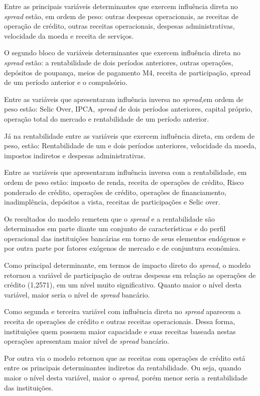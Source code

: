 \documentclass[
  12pt,
  12pt,
  openright,
  oneside,
  a4paper,
  chapter=TITLE,
  section=TITLE,
  subsection=TITLE,
  subsubsection=TITLE,
  portugues,
  sumario=tradicional]{abntex2}
\begin{document}
Entre as principais variáveis determinantes que exercem influência direta no \emph{spread} estão, em ordem de peso: outras despesas operacionais, as receitas de operação de crédito, outras receitas operacionais, despesas administrativas, velocidade da moeda e receita de serviços.

O segundo bloco de variáveis determinantes que exercem influência direta no \emph{spread} estão: a rentabilidade de dois períodos anteriores, outras operações, depósitos de poupança, meios de pagamento M4, receita de participação, spread de um período anterior e o compulsório.

Entre as variáveis que apresentaram influência inversa no \emph{spread},em ordem de peso estão: Selic Over, IPCA, \emph{spread} de dois períodos anteriores, capital próprio, operação total do mercado e rentabilidade de um período anterior.

Já na rentabilidade entre as variáveis que exercem influência direta, em ordem de peso, estão: Rentabilidade de um e dois períodos anteriores, velocidade da moeda, impostos indiretos e despesas administrativas.

Entre as variáveis que apresentaram influência inversa com a rentabilidade, em ordem de peso estão: imposto de renda, receita de operações de crédito, Risco ponderado de crédito, operações de crédito, operações de financiamento, inadimplência, depósitos a vista, receitas de participações e Selic over.

Os resultados do modelo remetem que o \emph{spread} e a rentabilidade são determinados em parte diante um conjunto de características e do perfil operacional das instituições bancárias em torno de seus elementos endógenos e por outra parte por fatores exógenos de mercado e de conjuntura econômica.

Como principal determinante, em termos de impacto direto do \emph{spread}, o modelo retornou a variável de participação de outras despesas em relação as operações de crédito (1,2571), em um nível muito significativo. Quanto maior o nível desta variável, maior seria o nível de \emph{spread} bancário.

Como segunda e terceira variável com influência direta no \emph{spread} aparecem a receita de operações de crédito e outras receitas operacionais. Dessa forma, instituições quem possuem maior capacidade e suas receitas baseada nestas operações apresentam maior nível de \emph{spread} bancário.

Por outra via o modelo retornou que as receitas com operações de crédito está entre os principais determinantes indiretos da rentabilidade. Ou seja, quando maior o nível desta variável, maior o \emph{spread}, porém menor seria a rentabilidade das instituições.
\end{document}
